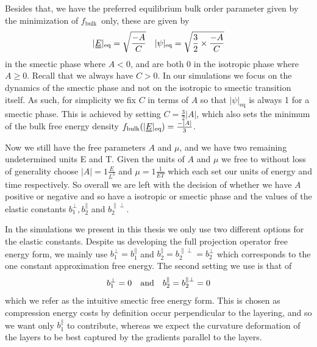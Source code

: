 \documentclass[12pt]{article}
\newcommand{\duf}[2]{\stackunder[0.5pt]{\stackunder[0.8pt]{\stackunder[1pt]{\ensuremath{#1}}{\rule{\widthof{\ensuremath{#2}}*\real{0.9}}{.1ex}}}{\rule{\widthof{\ensuremath{#2}}*\real{0.9}}{.1ex}}}{}}
\newcommand{\du}[1]{\duf{#1}{#1}}
\newcommand{\EE}{\ensuremath{\du{E}}}
\newcommand{\PE}{\ensuremath{|\psi|_\text{eq}}}
\newcommand{\FB}{\ensuremath{f_\text{bulk}}}
\begin{document}
        Besides that, we have the preferred equilibrium bulk order parameter given by the minimization of \FB\ only, these are given by
        \begin{align}
            |\EE|_\text{eq} = \sqrt{\frac{-A}{C}} && |\psi|_\text{eq} = \sqrt{\frac{3}{2}\times\frac{-A}{C}}
        \end{align}
        in the smectic phase where $A<0$, and are both 0 in the isotropic phase where $A \geq 0$.
        Recall that we always have $C>0$.
        In our simulations we focus on the dynamics of the smectic phase and not on the isotropic to smectic transition itself.
        As such, for simplicity we fix $C$ in terms of $A$ so that $\PE$ is always 1 for a smectic phase.
        This is achieved by setting $C = \frac{3}{2}|A|$, which also sets the minimum of the bulk free energy density $\FB(|\EE|_\text{eq})=\frac{-|A|}{3}$.

        Now we still have the free parameters $A$ and $\mu$, and we have two remaining undetermined units \si{E} and \si{T}.
        Given the units of $A$ and $\mu$ we free to without loss of generality choose $|A|=1\si{\frac{E}{L^3}}$ and $\mu = 1\si{\frac{1}{E T}}$ which each set our units of energy and time respectively.
        So overall we are left with the decision of whether we have $A$ positive or negative and so have a isotropic or smectic phase and the values of the elastic constants $b_1^\perp, b_2^\parallel$ and $b_2^{\parallel\perp}$.

        In the simulations we present in this thesis we only use two different options for the elastic constants.
        Despite us developing the full projection operator free energy form, we mainly use $b_1^\perp=b_1^\parallel$ and $b_2^\parallel=b_2^{\parallel\perp}=b_2^\perp$ which corresponds to the one constant approximation free energy.
        The second setting we use is that of
        \begin{equation}\label{eq:smF}
            b_1^\perp=0 \qq{and} b_2^\parallel=b_2^{\parallel\perp}=0
        \end{equation}
        which we refer as the intuitive smectic free energy form.
        This is chosen as compression energy costs by definition occur perpendicular to the layering, and so we want only $b_1^\parallel$ to contribute, whereas we expect the curvature deformation of the layers to be best captured by the gradients parallel to the layers.
    
\end{document}
